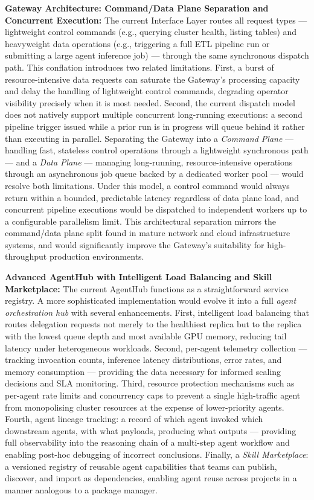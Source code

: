 \documentclass[12pt, a4paper]{report}
\begin{document}
\textbf{Gateway Architecture: Command/Data Plane Separation and Concurrent Execution:}
The current Interface Layer routes all request types — lightweight control commands
(e.g., querying cluster health, listing tables) and heavyweight data operations
(e.g., triggering a full ETL pipeline run or submitting a large agent inference job)
— through the same synchronous dispatch path.
This conflation introduces two related limitations.
First, a burst of resource-intensive data requests can saturate the Gateway's processing
capacity and delay the handling of lightweight control commands, degrading operator
visibility precisely when it is most needed.
Second, the current dispatch model does not natively support multiple concurrent
long-running executions: a second pipeline trigger issued while a prior run is in
progress will queue behind it rather than executing in parallel.
Separating the Gateway into a \emph{Command Plane} — handling fast, stateless control
operations through a lightweight synchronous path — and a \emph{Data Plane} — managing
long-running, resource-intensive operations through an asynchronous job queue backed by
a dedicated worker pool — would resolve both limitations.
Under this model, a control command would always return within a bounded, predictable
latency regardless of data plane load, and concurrent pipeline executions would be
dispatched to independent workers up to a configurable parallelism limit.
This architectural separation mirrors the command/data plane split found in mature
network and cloud infrastructure systems, and would significantly improve the Gateway's
suitability for high-throughput production environments.

\textbf{Advanced AgentHub with Intelligent Load Balancing and Skill Marketplace:}
The current AgentHub functions as a straightforward service registry.
A more sophisticated implementation would evolve it into a full \emph{agent
orchestration hub} with several enhancements.
First, intelligent load balancing that routes delegation requests not merely to the
healthiest replica but to the replica with the lowest queue depth and most available
GPU memory, reducing tail latency under heterogeneous workloads.
Second, per-agent telemetry collection — tracking invocation counts, inference latency
distributions, error rates, and memory consumption — providing the data necessary for
informed scaling decisions and SLA monitoring.
Third, resource protection mechanisms such as per-agent rate limits and concurrency
caps to prevent a single high-traffic agent from monopolising cluster resources at the
expense of lower-priority agents.
Fourth, agent lineage tracking: a record of which agent invoked which downstream
agents, with what payloads, producing what outputs — providing full observability into
the reasoning chain of a multi-step agent workflow and enabling post-hoc debugging of
incorrect conclusions.
Finally, a \emph{Skill Marketplace}: a versioned registry of reusable agent
capabilities that teams can publish, discover, and import as dependencies, enabling
agent reuse across projects in a manner analogous to a package manager.
\end{document}
